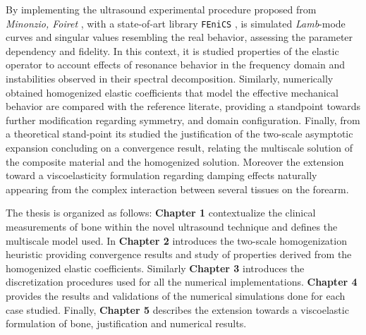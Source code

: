 \begin{intro}

By implementing the ultrasound experimental procedure proposed from \textit{Minonzio, Foiret} \cite{Foiret2014}, \cite{Minonzio2018} with a state-of-art library \texttt{FEniCS} \cite{logg2012automated}, is simulated  \textit{Lamb}-mode curves and singular values resembling the real behavior, assessing the parameter dependency and fidelity. In this context, it is studied properties of the elastic operator to account effects of resonance behavior in the frequency domain and instabilities observed in their spectral decomposition.
Similarly, numerically obtained homogenized elastic coefficients that model the effective mechanical behavior are compared with the reference literate, providing a standpoint towards further modification regarding symmetry, and domain configuration.
Finally, from a theoretical stand-point its studied the justification of the two-scale asymptotic expansion concluding on a convergence result, relating the multiscale solution of the composite material and the homogenized solution. Moreover the extension toward a viscoelasticity formulation regarding damping effects naturally appearing from the complex interaction between several tissues on the forearm.

The thesis is organized as follows: \textbf{Chapter 1} contextualize the clinical measurements of bone within the novel ultrasound technique and defines the multiscale model used. In \textbf{Chapter 2} introduces the two-scale homogenization heuristic providing convergence results and study of properties derived from the homogenized elastic coefficients. Similarly \textbf{Chapter 3} introduces the discretization procedures used for all the numerical implementations. \textbf{Chapter 4} provides the results and validations of the numerical simulations done for each case studied. Finally, \textbf{Chapter 5} describes the extension towards a viscoelastic formulation of bone, justification and numerical results.

\end{intro}